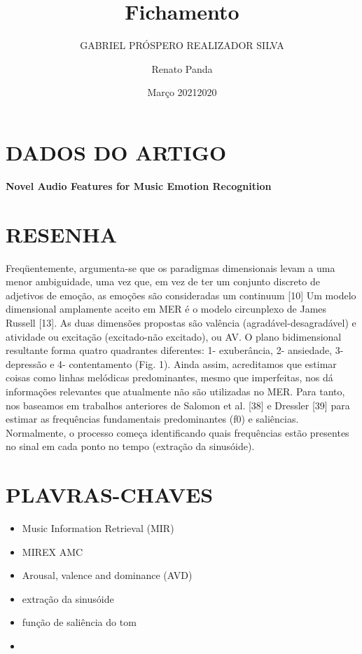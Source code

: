 \documentclass{article}
\title{Fichamento}
\author{GABRIEL PRÓSPERO REALIZADOR  SILVA}
\date{Março 2021}
\begin{document}
\maketitle

\section{DADOS DO ARTIGO}
\textbf{Novel Audio Features for Music Emotion Recognition \\}
\author{Renato Panda \\}
\date{2020}

\section{RESENHA}
Freqüentemente, argumenta-se que os paradigmas dimensionais levam a uma menor ambiguidade, uma vez que, em vez de ter um conjunto discreto de adjetivos de emoção, as emoções são consideradas um continuum [10] Um modelo dimensional amplamente aceito em MER é o modelo circunplexo de James Russell [13].
As duas dimensões propostas são valência (agradável-desagradável) e atividade ou excitação (excitado-não excitado), ou AV. O plano bidimensional resultante forma quatro quadrantes diferentes: 1- exuberância, 2- ansiedade, 3- depressão e 4- contentamento (Fig. 1).
Ainda assim, acreditamos que estimar coisas como linhas melódicas predominantes, mesmo que imperfeitas, nos dá informações relevantes que atualmente não são utilizadas no MER. Para tanto, nos baseamos em trabalhos anteriores de Salomon et al. [38] e Dressler [39] para estimar as frequências fundamentais predominantes (f0) e saliências. Normalmente, o processo começa identificando quais frequências estão presentes no sinal em cada ponto no tempo (extração da sinusóide).


\section{PLAVRAS-CHAVES}
\begin{itemize}
    \item Music Information Retrieval (MIR)
    \item MIREX AMC
    \item Arousal, valence and dominance (AVD)
    \item extração da sinusóide
    \item função de saliência do tom
    \item 
\end{itemize}
\end{document}
